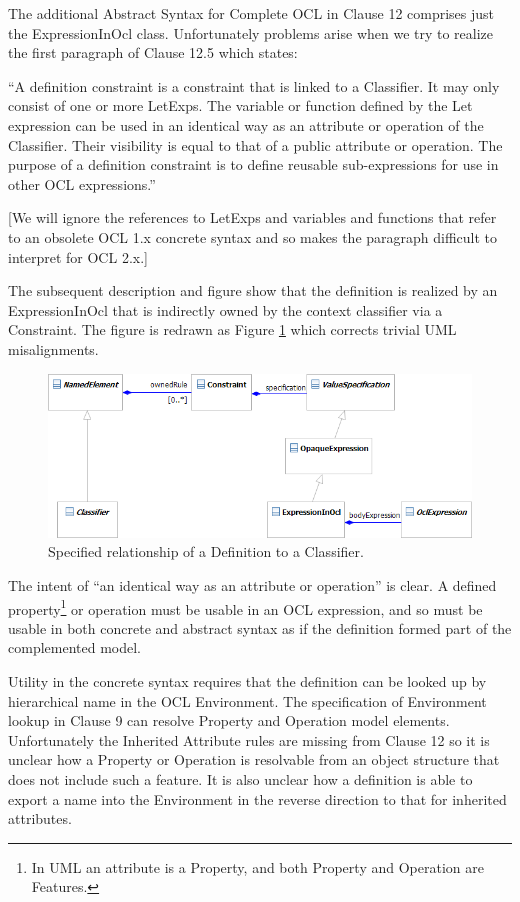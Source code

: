 \documentclass{eceasst}
\begin{document}
The additional Abstract Syntax for Complete OCL in Clause 12 comprises just the ExpressionInOcl class. Unfortunately problems arise when we try to realize the first paragraph of Clause 12.5 which states:

``A definition constraint is a constraint that is linked to a Classifier. It may only consist of one or more LetExps. The
variable or function defined by the Let expression can be used in an identical way as an attribute or operation of the
Classifier. Their visibility is equal to that of a public attribute or operation. The purpose of a definition constraint is to
define reusable sub-expressions for use in other OCL expressions.''

[We will ignore the references to LetExps and variables and functions that refer to an obsolete OCL 1.x concrete syntax and so makes the paragraph difficult to interpret for OCL 2.x.]

The subsequent description and figure show that the definition is realized by an ExpressionInOcl that is indirectly owned by the context classifier via a Constraint. The figure is redrawn as Figure \ref{fig:Definition} which corrects trivial UML misalignments. 

\begin{figure}
  \begin{center}
    \includegraphics[width=5.75in]{Definition.png}
  \end{center}
  \caption{Specified relationship of a Definition to a Classifier.}
  \label{fig:Definition}
\end{figure}

The intent of ``an identical way as an attribute or operation'' is clear. A defined property\footnote{In UML an attribute is a Property, and both Property and Operation are Features.} or operation must be usable in an OCL expression, and so must be usable in both concrete and abstract syntax as if the definition formed part of the complemented model.

Utility in the concrete syntax requires that the definition can be looked up by hierarchical name in the OCL Environment. The specification of Environment lookup in Clause 9 can resolve Property and Operation model elements. Unfortunately the Inherited Attribute rules are missing from Clause 12 so it is unclear how a Property or Operation is resolvable from an object structure that does not include such a feature. It is also unclear how a definition is able to export a name into the Environment in the reverse direction to that for inherited attributes.
\end{document}
